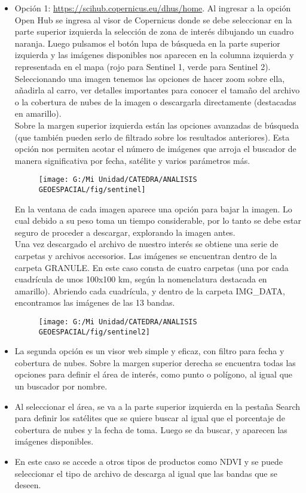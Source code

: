 \documentclass[a4paper,oneside,11pt,]{article}
\begin{document}
\begin{itemize}
\item Opción 1: \url{https://scihub.copernicus.eu/dhus/home}.
Al ingresar a la opción Open Hub se ingresa al visor de Copernicus donde se debe seleccionar en la parte superior izquierda la selección de zona de interés dibujando un cuadro naranja. Luego pulsamos el botón lupa de búsqueda en la parte superior izquierda y las imágenes disponibles nos aparecen en la columna izquierda y representada en el mapa (rojo para Sentinel 1, verde para Sentinel 2). Seleccionando una imagen tenemos las opciones de hacer zoom sobre ella, añadirla al carro, ver detalles importantes para conocer el tamaño del archivo o la cobertura de nubes de la imagen o descargarla directamente (destacadas en amarillo).\\
Sobre la margen superior izquierda están las opciones avanzadas de búsqueda (que también pueden serlo de filtrado sobre los resultados anteriores). Esta opción nos permiten acotar el número de imágenes que arroja el buscador de manera significativa por fecha, satélite y varios parámetros más.

\begin{figure}
\centering
\texttt{[image: G:/Mi Unidad/CATEDRA/ANALISIS GEOESPACIAL/fig/sentinel]}
\end{figure}

En la ventana de cada imagen aparece una opción para bajar la imagen. Lo cual debido a su peso toma un tiempo considerable, por lo tanto se debe estar seguro de proceder a descargar, explorando la imagen antes.\\
Una vez descargado el archivo de nuestro interés se obtiene una serie de carpetas y archivos accesorios. Las imágenes se encuentran dentro de la carpeta GRANULE. En este caso consta de cuatro carpetas (una por cada cuadrícula de unos 100x100 km, según la nomenclatura destacada en amarillo). Abriendo cada cuadrícula, y dentro de la carpeta IMG\_DATA, encontramos las imágenes de las 13 bandas.

\begin{figure}
\centering
\texttt{[image: G:/Mi Unidad/CATEDRA/ANALISIS GEOESPACIAL/fig/sentinel2]}
\end{figure}

\item La segunda opción es un visor web simple y eficaz, con filtro para fecha y cobertura de nubes. Sobre la margen superior derecha se encuentra todas las opciones para definir el área de interés, como punto o polígono, al igual que un buscador por nombre.
\item Al seleccionar el área, se va a la parte superior izquierda en la pestaña Search para definir los satélites que se quiere buscar al igual que el porcentaje de cobertura de nubes y la fecha de toma. Luego se da buscar, y aparecen las imágenes disponibles. 
\item En este caso se accede a otros tipos de productos como NDVI y se puede seleccionar el tipo de archivo de descarga al igual que las bandas que se deseen.
\end{itemize}
\end{document}
